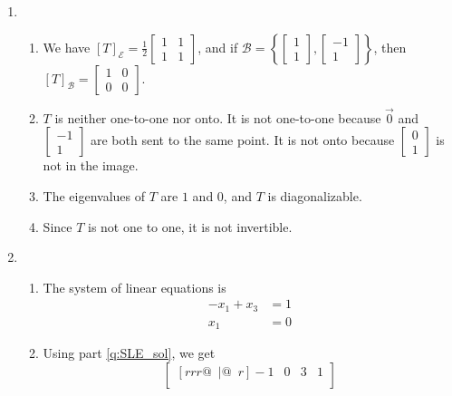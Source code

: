\documentclass[red]{tutorial}
\newcommand{\R}{\mathbb{R}}
\newcommand{\mat}[1]{\begin{bmatrix} #1 %
\end{bmatrix}}
\newcommand{\smat}[1]{\left[\begin{smallmatrix} #1 %
\end{smallmatrix}\right]}
\theoremstyle{definition}
\theoremstyle{theorem}
\begin{document}
{\begin{solutions}
\begin{enumerate}
\begin{enumerate}
          determinant is nonzero.
        \item
          When $A$ is not invertible, $x=0$, in which case the columns of $A$
          span a $2$-dimensional subspace of $\R^3$, meaning that the rank of
          $A$ is $2$.
        \item
          One basis is given by $\left\{\mat{0\\0\\1} , \mat{1\\0\\0}\right\}$
      \end{enumerate}
    \pagebreak %
    \item
      \begin{enumerate}
        \item
          We have
          $[T]_{\mathcal{E}} = \displaystyle\frac12\mat{1&1\\1&1}$,
          and if $\mathcal{B} = \left\{\mat{1\\1},\mat{-1\\1}\right\}$,
          then $[T]_{\mathcal{B}} = \mat{1&0\\0&0}$.
        \item $T$ is neither one-to-one nor onto. It is not
          one-to-one because $\vec 0$ and $\smat{-1\\1}$ are both sent
          to the same point. It is not onto because $\smat{0\\1}$ is not
          in the image.
        \item The eigenvalues of $T$ are $1$ and $0$,
          and $T$ is diagonalizable.
        \item Since $T$ is not one to one, it is not invertible.
      \end{enumerate}
    \item
      \begin{enumerate}
        \item\label{q:SLE_sol}
          The system of linear equations is
          \begin{align*}
            -x_1 + x_3 &= 1\\
            x_1 \phantom{{} + x_3}&= 0
          \end{align*}
        \item Using part \ref{q:SLE_sol}, we get
          \begin{equation*}
            \begin{bmatrix}[rrr@{\enspace}|@{\enspace}r]
              -1 & 0 & 3 & 1 \\

\end{bmatrix}
\end{equation*}
\end{enumerate}
\end{enumerate}
\end{solutions}}
\end{document}
